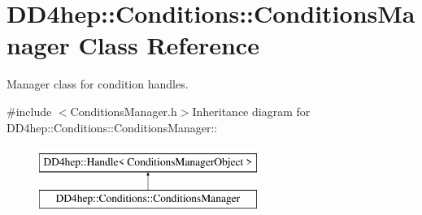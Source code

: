 \hypertarget{class_d_d4hep_1_1_conditions_1_1_conditions_manager}{
\section{DD4hep::Conditions::ConditionsManager Class Reference}
\label{class_d_d4hep_1_1_conditions_1_1_conditions_manager}
}


Manager class for condition handles.  


{\ttfamily \#include $<$ConditionsManager.h$>$}Inheritance diagram for DD4hep::Conditions::ConditionsManager::\begin{figure}[H]
\begin{center}
\leavevmode
\includegraphics[height=2cm]{class_d_d4hep_1_1_conditions_1_1_conditions_manager}
\end{center}
\end{figure}
